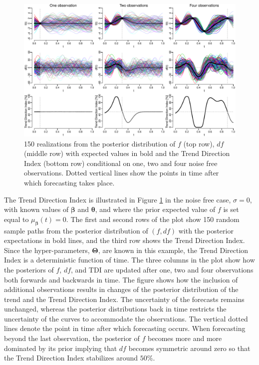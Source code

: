 \documentclass[
  11pt,
]{article}
\theoremstyle{nonumberplain}
\begin{document}
\begin{figure}[htb]
\center\includegraphics{TDIexample}
\caption{150 realizations from the posterior distribution of $f$ (top row), $df$ (middle row) with expected values in bold and the Trend Direction Index (bottom row) conditional on one, two and four noise free observations. Dotted vertical lines show the points in time after which forecasting takes place.}
\label{fig:probabilisticExample}
\end{figure}

The Trend Direction Index is illustrated in Figure
\ref{fig:probabilisticExample} in the noise free case, \(\sigma = 0\),
with known values of \(\bm{\beta}\) and \(\bm{\theta}\), and where the
prior expected value of \(f\) is set equal to
\(\mu_{\bm{\beta}}(t) = 0\). The first and second rows of the plot show
150 random sample paths from the posterior distribution of \((f, df)\)
with the posterior expectations in bold lines, and the third row shows
the Trend Direction Index. Since the hyper-parameters, \(\bm{\Theta}\),
are known in this example, the Trend Direction Index is a deterministic
function of time. The three columns in the plot show how the posteriors
of \(f\), \(df\), and \(\mathrm{TDI}\) are updated after one, two and
four observations both forwards and backwards in time. The figure shows
how the inclusion of additional observations results in changes of the
posterior distribution of the trend and the Trend Direction Index. The
uncertainty of the forecasts remains unchanged, whereas the posterior
distributions back in time restricts the uncertainty of the curves to
accommodate the observations. The vertical dotted lines denote the point
in time after which forecasting occurs. When forecasting beyond the last
observation, the posterior of \(f\) becomes more and more dominated by
its prior implying that \(df\) becomes symmetric around zero so that the
Trend Direction Index stabilizes around \(50\%\).
\end{document}
